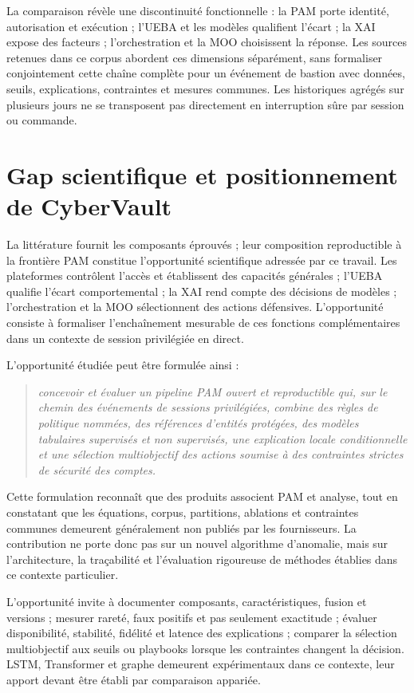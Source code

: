 \documentclass[11pt,a4paper,oneside]{report}
\theoremstyle{definition}
\theoremstyle{plain}
\begin{document}
La comparaison révèle une discontinuité fonctionnelle : la PAM porte identité, autorisation et exécution ; l'UEBA et les modèles qualifient l'écart ; la XAI expose des facteurs ; l'orchestration et la MOO choisissent la réponse. Les sources retenues dans ce corpus abordent ces dimensions séparément, sans formaliser conjointement cette chaîne complète pour un événement de bastion avec données, seuils, explications, contraintes et mesures communes. Les historiques agrégés sur plusieurs jours ne se transposent pas directement en interruption sûre par session ou commande.

\section{Gap scientifique et positionnement de CyberVault}
\label{sec:domain-gap}

La littérature fournit les composants éprouvés ; leur composition reproductible à la frontière PAM constitue l'opportunité scientifique adressée par ce travail. Les plateformes contrôlent l'accès et établissent des capacités générales ; l'UEBA qualifie l'écart comportemental ; la XAI rend compte des décisions de modèles ; l'orchestration et la MOO sélectionnent des actions défensives. L'opportunité consiste à formaliser l'enchaînement mesurable de ces fonctions complémentaires dans un contexte de session privilégiée en direct.

L'opportunité étudiée peut être formulée ainsi :
\begin{quote}
\emph{concevoir et évaluer un pipeline PAM ouvert et reproductible qui, sur le chemin des événements de sessions privilégiées, combine des règles de politique nommées, des références d'entités protégées, des modèles tabulaires supervisés et non supervisés, une explication locale conditionnelle et une sélection multiobjectif des actions soumise à des contraintes strictes de sécurité des comptes.}
\end{quote}

Cette formulation reconnaît que des produits associent PAM et analyse, tout en constatant que les équations, corpus, partitions, ablations et contraintes communes demeurent généralement non publiés par les fournisseurs. La contribution ne porte donc pas sur un nouvel algorithme d'anomalie, mais sur l'architecture, la traçabilité et l'évaluation rigoureuse de méthodes établies dans ce contexte particulier.

L'opportunité invite à documenter composants, caractéristiques, fusion et versions ; mesurer rareté, faux positifs et pas seulement exactitude ; évaluer disponibilité, stabilité, fidélité et latence des explications ; comparer la sélection multiobjectif aux seuils ou playbooks lorsque les contraintes changent la décision. LSTM, Transformer et graphe demeurent expérimentaux dans ce contexte, leur apport devant être établi par comparaison appariée.
\end{document}
